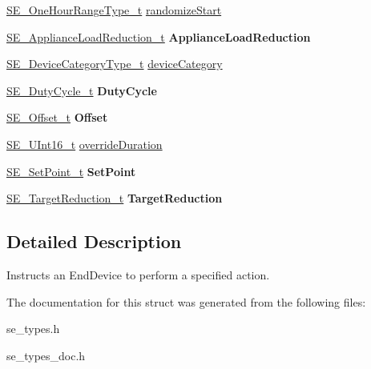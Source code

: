 \begin{DoxyCompactItemize}
\item 
\hyperlink{group__OneHourRangeType_ga2b9c57435b20a5fc0689922b77e97c2d}{S\+E\+\_\+\+One\+Hour\+Range\+Type\+\_\+t} \hyperlink{group__EndDeviceControl_gac9278298c4d98c9ba32267d7e113cce2}{randomize\+Start}
\item 
\hyperlink{structSE__ApplianceLoadReduction__t}{S\+E\+\_\+\+Appliance\+Load\+Reduction\+\_\+t} {\bfseries Appliance\+Load\+Reduction}
\item 
\hyperlink{group__DeviceCategoryType_gafc136ae19a3dd5b2fd2265d848ddeb2f}{S\+E\+\_\+\+Device\+Category\+Type\+\_\+t} \hyperlink{group__EndDeviceControl_ga1ecabe8c562fa33ae1294d90bc5a5bd2}{device\+Category}
\item 
\hyperlink{structSE__DutyCycle__t}{S\+E\+\_\+\+Duty\+Cycle\+\_\+t} {\bfseries Duty\+Cycle}
\item 
\hyperlink{structSE__Offset__t}{S\+E\+\_\+\+Offset\+\_\+t} {\bfseries Offset}
\item 
\hyperlink{group__UInt16_gac68d541f189538bfd30cfaa712d20d29}{S\+E\+\_\+\+U\+Int16\+\_\+t} \hyperlink{group__EndDeviceControl_ga8a762812da5a0774db22d5b8984c4992}{override\+Duration}
\item 
\hyperlink{structSE__SetPoint__t}{S\+E\+\_\+\+Set\+Point\+\_\+t} {\bfseries Set\+Point}
\item 
\hyperlink{structSE__TargetReduction__t}{S\+E\+\_\+\+Target\+Reduction\+\_\+t} {\bfseries Target\+Reduction}
\end{DoxyCompactItemize}


\subsection{Detailed Description}
Instructs an End\+Device to perform a specified action. 

The documentation for this struct was generated from the following files\+:\begin{DoxyCompactItemize}
\item 
se\+\_\+types.\+h\item 
se\+\_\+types\+\_\+doc.\+h\end{DoxyCompactItemize}

